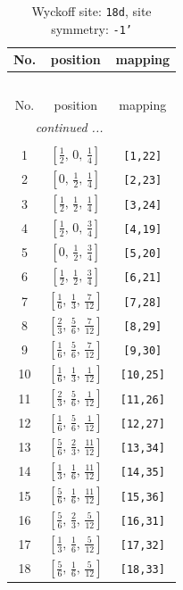 \documentclass[fleqn,8pt]{jsarticle}
\begin{document}
\begin{longtable}{ccc}
\caption{Wyckoff site: {\tt 18d}, site symmetry: {\tt -1'}}
 \\
 \hline \hline
No. & position & mapping \\ \hline \endfirsthead

\multicolumn{2}{l}{\tablename\ \thetable{}} \\
 \hline \hline
No. & position & mapping \\ \hline \endhead

 \hline \hline
\multicolumn{2}{r}{\footnotesize\it continued ...} \\ \endfoot

 \hline \hline
\multicolumn{2}{r}{} \\ \endlastfoot

1 & $\left[ \frac{1}{2},\, 0,\, \frac{1}{4} \right]$ & {\tt [1,22]} \\ \hline
2 & $\left[ 0,\, \frac{1}{2},\, \frac{1}{4} \right]$ & {\tt [2,23]} \\ \hline
3 & $\left[ \frac{1}{2},\, \frac{1}{2},\, \frac{1}{4} \right]$ & {\tt [3,24]} \\ \hline
4 & $\left[ \frac{1}{2},\, 0,\, \frac{3}{4} \right]$ & {\tt [4,19]} \\ \hline
5 & $\left[ 0,\, \frac{1}{2},\, \frac{3}{4} \right]$ & {\tt [5,20]} \\ \hline
6 & $\left[ \frac{1}{2},\, \frac{1}{2},\, \frac{3}{4} \right]$ & {\tt [6,21]} \\ \hline
7 & $\left[ \frac{1}{6},\, \frac{1}{3},\, \frac{7}{12} \right]$ & {\tt [7,28]} \\ \hline
8 & $\left[ \frac{2}{3},\, \frac{5}{6},\, \frac{7}{12} \right]$ & {\tt [8,29]} \\ \hline
9 & $\left[ \frac{1}{6},\, \frac{5}{6},\, \frac{7}{12} \right]$ & {\tt [9,30]} \\ \hline
10 & $\left[ \frac{1}{6},\, \frac{1}{3},\, \frac{1}{12} \right]$ & {\tt [10,25]} \\ \hline
11 & $\left[ \frac{2}{3},\, \frac{5}{6},\, \frac{1}{12} \right]$ & {\tt [11,26]} \\ \hline
12 & $\left[ \frac{1}{6},\, \frac{5}{6},\, \frac{1}{12} \right]$ & {\tt [12,27]} \\ \hline
13 & $\left[ \frac{5}{6},\, \frac{2}{3},\, \frac{11}{12} \right]$ & {\tt [13,34]} \\ \hline
14 & $\left[ \frac{1}{3},\, \frac{1}{6},\, \frac{11}{12} \right]$ & {\tt [14,35]} \\ \hline
15 & $\left[ \frac{5}{6},\, \frac{1}{6},\, \frac{11}{12} \right]$ & {\tt [15,36]} \\ \hline
16 & $\left[ \frac{5}{6},\, \frac{2}{3},\, \frac{5}{12} \right]$ & {\tt [16,31]} \\ \hline
17 & $\left[ \frac{1}{3},\, \frac{1}{6},\, \frac{5}{12} \right]$ & {\tt [17,32]} \\ \hline
18 & $\left[ \frac{5}{6},\, \frac{1}{6},\, \frac{5}{12} \right]$ & {\tt [18,33]} \\
\end{longtable}
\end{document}
